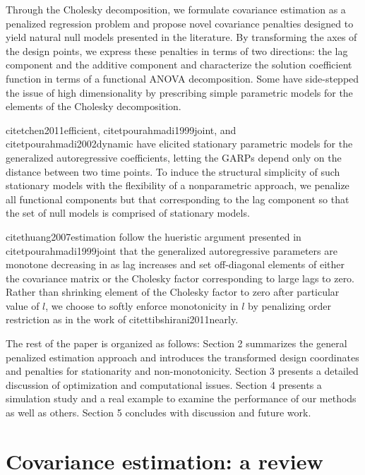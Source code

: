 \documentclass[12pt]{article}
\theoremstyle{definition}
\begin{document}
Through the Cholesky decomposition, we formulate covariance estimation as a penalized regression problem and propose novel covariance penalties designed to yield natural null models presented in the literature. By transforming the axes of the design points, we express these penalties in terms of two directions: the lag component and the additive component and characterize the solution coefficient function in terms of a functional ANOVA decomposition. Some have side-stepped the issue of high dimensionality by prescribing simple parametric models for the elements of the Cholesky decomposition. 

citet{chen2011efficient}, citet{pourahmadi1999joint}, and citet{pourahmadi2002dynamic} have elicited stationary parametric models for the generalized autoregressive coefficients, letting the GARPs depend only on the distance between two time points. To induce the structural simplicity of such stationary models with the flexibility of a nonparametric approach, we penalize all functional components but that corresponding to the lag component so that the set of null models is comprised of stationary models.

citet{huang2007estimation} follow the hueristic argument presented in citet{pourahmadi1999joint} that the generalized autoregressive parameters are monotone decreasing in as lag increases and set off-diagonal elements of either the covariance matrix or the Cholesky factor corresponding to large lags to zero. Rather than shrinking element of the Cholesky factor to zero after particular value of $l$, we choose to softly enforce monotonicity in $l$ by penalizing order restriction as in the work of citet{tibshirani2011nearly}. 
	
The rest of the paper is organized as follows: Section 2 summarizes the general penalized estimation approach and introduces the transformed design coordinates and penalties for stationarity and non-monotonicity. Section 3 presents a detailed discussion of optimization and computational issues. Section 4 presents a simulation study and a real example to examine the performance of our methods as well as others. Section 5 concludes with discussion and future work.	

\section{Covariance estimation: a review}
\end{document}
